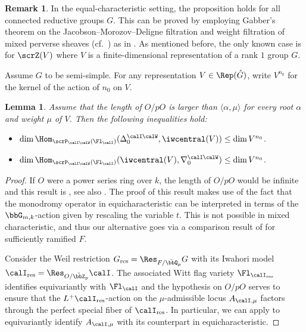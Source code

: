 \documentclass[10pt, reqno]{amsart}
\theoremstyle{plain}
\newtheorem{lemma}[theorem]{Lemma}
\theoremstyle{definition}
\newtheorem{remark}[theorem]{Remark}
\numberwithin{equation}{section}
\begin{document}
\begin{remark}
	In the equal-characteristic setting, the proposition holds for all connected reductive groups $G$. This can be proved by employing Gabber's theorem on the Jacobson–Morozov–Deligne filtration  and weight filtration of mixed perverse sheaves (cf.\ \cite[Section5.1]{beilinson1993proof}) as in \cite[Section6.5.8]{AR}. As mentioned before, the only known case is for $\scrZ(V)$ where $V$ is a finite-dimensional representation of a rank $1$ group $G$. 
\end{remark}
\fi
\iffalse	Assume $G$ to be semi-simple. For any representation $V\in\Rep(\hat{G})$, write $V^{n_0}$ for the kernel of the action of $n_0$ on $V$.
\begin{lemma}\label{lemma_inequality_Z_IW_mult_unit} Assume that the length of $O/pO$ is larger than $\langle \alpha, \mu \rangle$ for every root $\alpha$ and weight $\mu$ of $V$. Then the following inequalities hold:
	\begin{itemize}
		\item [(1)] $\dim \Hom_{\scrP_{{\calI\calW}}(\Fl_\calI)} (\Delta_0^{
			{\calI\calW}},\iwcentral(V))\leq \dim V^{n_0}$.
		\item [(2)] $\dim \Hom_{\scrP_{{\calI\calW}}(\Fl_\calI)} (\iwcentral(V),\nabla_0^{{\calI\calW}})\leq \dim V^{n_0}$.
	\end{itemize}
\end{lemma}

\begin{proof}
	If $O$ were a power series ring over $k$, the length of $O/pO$ would be infinite and this result is \cite[Lemma 29]{AB09}, see also \cite[Lemma 6.5.25]{AR}. The proof of this result makes use of the fact that the monodromy operator in equicharacteristic can be interpreted in terms of the $\bbG_{m,k}$-action given by rescaling the variable $t$. This is not possible in mixed characteristic, and thus our alternative goes via a comparison result of \cite{AGLR22} for sufficiently ramified $F$. 
	
	Consider the Weil restriction $G_{\mathrm{res}}=\Res_{F/\breve \bbQ_p} G$ with its Iwahori model $\calI_{\mathrm{res}}=\Res_{O/\breve \bbZ_p}\calI$. The associated Witt flag variety $\Fl_{\calI_{\mathrm{res}}}$ identifies equivariantly with $\Fl_{\calI}$ and the hypothesis on $O/pO$ serves to ensure that the $L^+\calI_{\mathrm{res}}$-action on the $\mu$-admissible locus $A_{\calI,\mu}$ factors through the perfect special fiber of $\calI_{\mathrm{res}}$. In particular, we can apply \cite[Lemma 3.15]{AGLR22} to equivariantly identify $A_{\calI,\mu}$ with its counterpart in equicharacteristic.
\end{proof}
\end{document}
